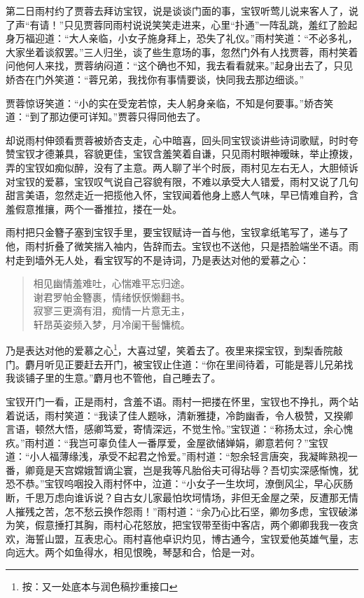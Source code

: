 \documentclass[12pt,oneside]{book}
\newenvironment{shici}{%
\begin{verse}%
\centering\large\hspace{12pt}}%
{\end{verse}}
\begin{document}
第二日雨村约了贾蓉去拜访宝钗，说是谈谈门面的事，宝钗听莺儿说来客人了，说了声“有请！”只见贾蓉同雨村说说笑笑走进来，心里“扑通”一阵乱跳，羞红了脸起身万福迎道：“大人亲临，小女子施身拜上，恐失了礼仪。”雨村笑道：“不必多礼，大家坐着谈叙罢。”三人归坐，谈了些生意场的事，忽然门外有人找贾蓉，雨村笑着问他何人来找，贾蓉纳闷道：“这个确也不知，我去看看就来。”起身出去了，只见娇杏在门外笑道：“蓉兄弟，我找你有事情要谈，快同我去那边细谈。”

贾蓉惊讶笑道：“小的实在受宠若惊，夫人躬身亲临，不知是何要事。”娇杏笑道：“到了那边便可详知。”贾蓉只得同他去了。

却说雨村伸颈看贾蓉被娇杏支走，心中暗喜，回头同宝钗谈讲些诗词歌赋，时时夸赞宝钗才德兼具，容貌更佳，宝钗含羞笑着自谦，只见雨村眼神暧昧，举止撩拨，弄的宝钗如痴似醉，没有了主意。两人聊了半个时辰，雨村见左右无人，大胆倾诉对宝钗的爱慕，宝钗叹气说自己容貌有限，不难以承受大人错爱，雨村又说了几句甜言美语，忽然走近一把揽他入怀，宝钗闻着他身上惑人气味，早已情难自矜，含羞假意推攘，两个一番推拉，搂在一处。

雨村把只金簪子塞到宝钗手里，要宝钗赋诗一首与他，宝钗拿纸笔写了，递与了他，雨村折叠了微笑揣入袖内，告辞而去。宝钗也不送他，只是捂脸端坐不语。雨村走到墙外无人处，看宝钗写的不是诗词，乃是表达对他的爱慕之心：

\begin{shici}
相见幽情羞难吐，心惴难平忘归途。\\
谢君罗帕金簪裹，情绪恹恹懒翻书。\\
寂寥三更滴有泪，痴情一片意无主，\\
轩昂英姿频入梦，月冷阑干髻慵梳。
\end{shici}


乃是表达对他的爱慕之心\footnote{按：又一处底本与润色稿抄重接口}，大喜过望，笑着去了。夜里来探宝钗，到梨香院敲门。麝月听见正要赶去开门，被宝钗止住道：“你在里间待着，可能是蓉儿兄弟找我谈铺子里的生意。”麝月也不管他，自己睡去了。

宝钗开门一看，正是雨村，含羞不语。雨村一把搂在怀里，宝钗也不挣扎，两个站着说话，雨村笑道：“我读了佳人题咏，清新雅捷，冷韵幽香，令人极赞，又揆卿言语，顿然大悟，感卿笃爱，寄情深远，不觉生怜。”宝钗道：“称扬太过，余心愧疚。”雨村道：“我岂可辜负佳人一番厚爱，金屋欲储婵娟，卿意若何？”宝钗道：“小人福薄缘浅，承受不起君之怜爱。”雨村道：“恕余轻言唐突，我凝眸熟视一番，卿竟是天宫嫦娥暂谪尘寰，岂是我等凡胎俗夫可得玷辱？吾切实深感惭愧，犹恐不恭。”宝钗呜咽投入雨村怀中，泣道：“小女子一生坎坷，潦倒风尘，早心灰肠断，千思万虑向谁诉说？自古女儿家最怕坎坷情场，非但无金屋之荣，反遭那无情人摧残之苦，怎不愁云换作怨雨！”雨村道：“余乃心比石坚，卿勿多虑，宝钗破涕为笑，假意捶打其胸，雨村心花怒放，把宝钗带至街中客店，两个卿卿我我一夜贪欢，海誓山盟，互表忠心。雨村喜他卓识灼见，博古通今，宝钗爱他英雄气量，志向远大。两个如鱼得水，相见恨晚，琴瑟和合，恰是一对。
\end{document}
